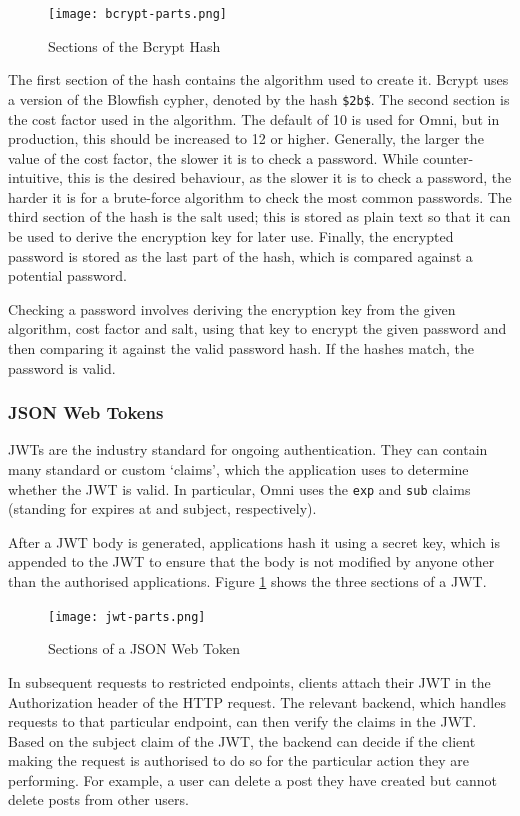 \begin{figure}[htbp]
\texttt{[image: bcrypt-parts.png]}
\centering
\caption{Sections of the Bcrypt Hash}
\end{figure}

The first section of the hash contains the algorithm used to create it. Bcrypt uses a version of the Blowfish cypher, denoted by the hash \verb|$2b$|.
The second section is the cost factor used in the algorithm. The default of 10 is used for Omni, but in production, this should be increased to 12 or higher.
Generally, the larger the value of the cost factor, the slower it is to check a password.
While counter-intuitive, this is the desired behaviour, as the slower it is to check a password, the harder it is for a brute-force algorithm to check the most common passwords.
The third section of the hash is the salt used; this is stored as plain text so that it can be used to derive the encryption key for later use.
Finally, the encrypted password is stored as the last part of the hash, which is compared against a potential password.

Checking a password involves deriving the encryption key from the given algorithm, cost factor and salt, using that key to encrypt the given password and then comparing it against the valid password hash. If the hashes match, the password is valid.

\subsubsection{JSON Web Tokens}
JWTs are the industry standard for ongoing authentication. They can contain many standard or custom `claims', which the application uses to determine whether the JWT is valid.
In particular, Omni uses the \verb|exp| and \verb|sub| claims (standing for expires at and subject, respectively). 

After a JWT body is generated, applications hash it using a secret key, which is appended to the JWT to ensure that the body is not modified by anyone other than the authorised applications. 
Figure \ref{fig:jwt-parts} shows the three sections of a JWT.

\begin{figure}[htbp]
\texttt{[image: jwt-parts.png]}
\centering
\caption{Sections of a JSON Web Token}
\label{fig:jwt-parts}
\end{figure}

In subsequent requests to restricted endpoints, clients attach their JWT in the Authorization header of the HTTP request.
The relevant backend, which handles requests to that particular endpoint, can then verify the claims in the JWT.
Based on the subject claim of the JWT, the backend can decide if the client making the request is authorised to do so for the particular action they are performing.
For example, a user can delete a post they have created but cannot delete posts from other users.


